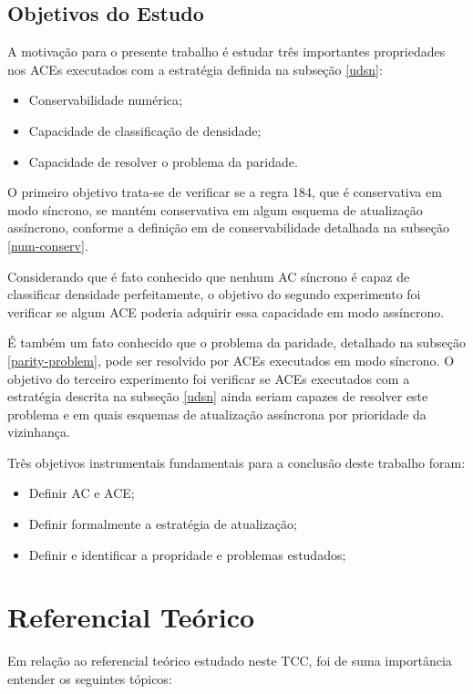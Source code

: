 \documentclass[a4paper,12pt]{ltxdoc}
\newcommand\tab[1][1cm]{\hspace*{#1}}
\begin{document}

\subsection{Objetivos do Estudo} 

A motivação para o presente trabalho é estudar três importantes propriedades nos ACEs executados com a estratégia definida na subseção \ref{udsn}: 

\begin{itemize}
  \item Conservabilidade numérica;
  \item Capacidade de classificação de densidade;
  \item Capacidade de resolver o problema da paridade.
\end{itemize}

\tab O primeiro objetivo trata-se de verificar se a regra 184, que é conservativa em modo síncrono, se mantém conservativa em algum esquema de atualização assíncrono, conforme a definição em de conservabilidade detalhada na subseção \ref{num-conserv}. 

\tab Considerando que é fato conhecido que nenhum AC síncrono é capaz de classificar densidade perfeitamente, o objetivo do segundo experimento foi verificar se algum ACE poderia adquirir essa capacidade em modo assíncrono.

\tab É também um fato conhecido que o problema da paridade, detalhado na subseção \ref{parity-problem}, pode ser resolvido por ACEs executados em modo síncrono. O objetivo do terceiro experimento foi verificar se ACEs executados com a estratégia descrita na subseção \ref{udsn} ainda seriam capazes de resolver este problema e em quais esquemas de atualização assíncrona por prioridade da vizinhança.

\tab Três objetivos instrumentais fundamentais para a conclusão deste trabalho foram:

\begin{itemize}
  \item Definir AC e ACE;
  \item Definir formalmente a estratégia de atualização;
  \item Definir e identificar a propridade e problemas estudados;
\end{itemize}

\section{Referencial Teórico} \label{referencial}
Em relação ao referencial teórico estudado neste TCC, foi de suma importância entender os seguintes tópicos:
\end{document}
